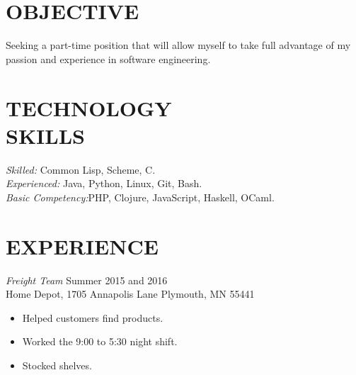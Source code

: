 \documentclass[margin, 10pt]{res} %
\begin{document}
\begin{resume}

 
\section{OBJECTIVE}  

Seeking a part-time position that will allow myself to take full advantage of my passion and experience in software engineering.


\section{TECHNOLOGY \\ SKILLS} 

{\sl Skilled:} Common Lisp, Scheme, C. \\
{\sl Experienced:} Java, Python, Linux, Git, Bash. \\
{\sl Basic Competency:}PHP, Clojure, JavaScript, Haskell, OCaml. \\ 
 
\section{EXPERIENCE}

{\sl Freight Team} \hfill Summer 2015 and 2016 \\
Home Depot, 1705 Annapolis Lane Plymouth, MN 55441 
\begin{itemize}
\item Helped customers find products.
\item Worked the 9:00 to 5:30 night shift. 
\item Stocked shelves.
\end{itemize} 



\end{resume}
\end{document}
